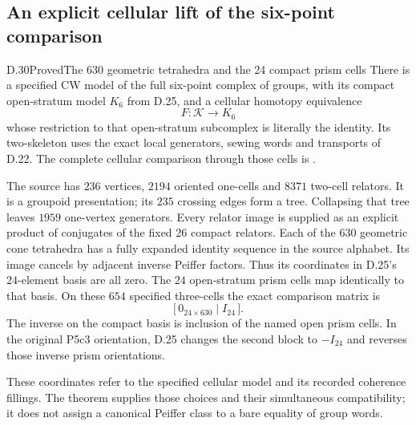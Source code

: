 \subsection{An explicit cellular lift of the six-point comparison}

\begin{result}{D.30}{Proved}{The 630 geometric tetrahedra and the 24 compact prism cells}
There is a specified CW model of the full six-point
complex of groups, with its compact open-stratum model
$K_6$ from D.25, and a cellular homotopy equivalence
\[
                       F:\mathcal K\longrightarrow K_6
\]
whose restriction to that open-stratum subcomplex is
literally the identity.  Its two-skeleton uses the exact
local generators, sewing words and transports of D.22.
The complete cellular comparison through those cells is
.

The source has $236$ vertices, $2194$ oriented one-cells
and $8371$ two-cell relators.  It is a groupoid
presentation; its $235$ crossing edges form a tree.
Collapsing that tree leaves $1959$ one-vertex generators.  Every relator image is supplied as an
explicit product of conjugates of the fixed $26$ compact
relators.  Each of the $630$ geometric cone tetrahedra
has a fully expanded identity sequence in the source
alphabet.  Its image cancels by adjacent inverse
Peiffer factors.  Thus its coordinates in D.25's
$24$-element basis are all zero.  The $24$ open-stratum
prism cells map identically to that basis.  On these
$654$ specified three-cells the exact comparison matrix is
\[
                     \bigl[\,0_{24\times630}\mid I_{24}\,\bigr].
                                                               \tag{D.33}
\]
The inverse on the compact basis is inclusion of the
named open prism cells.  In the original P5c3 orientation,
D.25 changes the second block to $-I_{24}$ and reverses
those inverse prism orientations.

These coordinates refer to the specified cellular
model and its recorded coherence fillings.  The theorem
supplies those choices and their simultaneous
compatibility; it does not assign a canonical
Peiffer class to a bare equality of group words.
\end{result}
